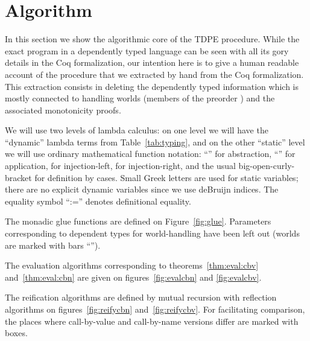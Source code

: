 \documentclass{eptcs}
\theoremstyle{definition}
\theoremstyle{plain}
\theoremstyle{remark}
\begin{document}
\section{Algorithm}\label{sec:algorithm}

In this section we show the algorithmic core of the TDPE procedure. While the exact program in a dependently typed language can be seen with all its gory details in the Coq formalization, our intention here is to give a human readable account of the procedure that we extracted by hand from the Coq formalization. This extraction consists in deleting the dependently typed information which is mostly connected to handling worlds (members of the preorder ) and the associated monotonicity proofs.

We will use two levels of lambda calculus: on one level we will have the ``dynamic'' lambda terms from Table~\ref{tab:typing}, and on the other ``static'' level we will use ordinary mathematical function notation: ``'' for abstraction, ``'' for application,  for injection-left,  for injection-right, and the usual big-open-curly-bracket for definition by cases. Small Greek letters  are used for static variables; there are no explicit dynamic variables since we use deBruijn indices. The equality symbol ``:='' denotes definitional equality.

The monadic glue functions are defined on Figure~\ref{fig:glue}. Parameters corresponding to dependent types for world-handling have been left out (worlds are marked with bars ``'').
\begin{figure*}
\centering
  
  \caption{Monadic glue functions}
  \label{fig:glue}
\end{figure*}

The evaluation algorithms corresponding to theorems~\ref{thm:eval:cbv} and~\ref{thm:eval:cbn} are given on figures~\ref{fig:evalcbn} and \ref{fig:evalcbv}.

\begin{figure*}
\centering
  
  \caption{Evaluation for call-by-name}
  \label{fig:evalcbn}
\end{figure*}

\begin{figure*}
\centering
    
  \caption{Evaluation for call-by-value}
  \label{fig:evalcbv}
\end{figure*}

The reification algorithms are defined by mutual recursion with reflection algorithms on figures~\ref{fig:reifycbn} and~\ref{fig:reifycbv}. For facilitating comparison, the places where call-by-value and call-by-name versions differ are marked with boxes.
\end{document}
